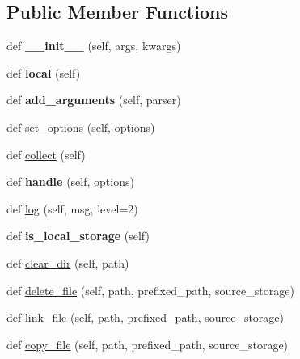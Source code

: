 \subsection*{Public Member Functions}
\begin{DoxyCompactItemize}
\item 
\mbox{\label{classcollectstatic_1_1_command_a92eabc0d18cf3ec0caea2925ba90f349}} 
def {\bfseries \+\_\+\+\_\+init\+\_\+\+\_\+} (self, args, kwargs)
\item 
\mbox{\label{classcollectstatic_1_1_command_a1081e3bb3e93c5dd951d02391ee0015d}} 
def {\bfseries local} (self)
\item 
\mbox{\label{classcollectstatic_1_1_command_a1cf78a61cef48e4f2df1a6d1a723484f}} 
def {\bfseries add\+\_\+arguments} (self, parser)
\item 
def \mbox{\hyperlink{classcollectstatic_1_1_command_af0c68c4ccda7c94f3151baf1e8e5cabf}{set\+\_\+options}} (self, options)
\item 
def \mbox{\hyperlink{classcollectstatic_1_1_command_a87b98c34cdd7ca085989391a651001ea}{collect}} (self)
\item 
\mbox{\label{classcollectstatic_1_1_command_a06e8b4a92807d65679d14b09d1663474}} 
def {\bfseries handle} (self, options)
\item 
def \mbox{\hyperlink{classcollectstatic_1_1_command_adee4db59150b087b0c356a3fca6cae09}{log}} (self, msg, level=2)
\item 
\mbox{\label{classcollectstatic_1_1_command_a74b4152cb2cced13538c85a76a62e050}} 
def {\bfseries is\+\_\+local\+\_\+storage} (self)
\item 
def \mbox{\hyperlink{classcollectstatic_1_1_command_a7b3b8efdcb0e85c8e34e60ca3a8edb9f}{clear\+\_\+dir}} (self, path)
\item 
def \mbox{\hyperlink{classcollectstatic_1_1_command_a354250ae3e24ff46188e4ff2a25de53e}{delete\+\_\+file}} (self, path, prefixed\+\_\+path, source\+\_\+storage)
\item 
def \mbox{\hyperlink{classcollectstatic_1_1_command_a2dbd25e0bd5e736fcf66392a487c7969}{link\+\_\+file}} (self, path, prefixed\+\_\+path, source\+\_\+storage)
\item 
def \mbox{\hyperlink{classcollectstatic_1_1_command_abb286d406dd14579b3dd7cfca30ec3a7}{copy\+\_\+file}} (self, path, prefixed\+\_\+path, source\+\_\+storage)
\end{DoxyCompactItemize}
